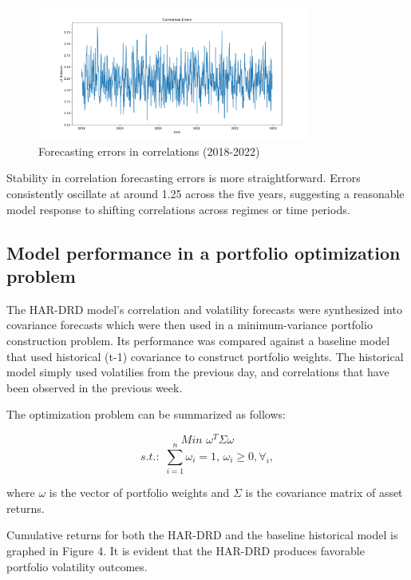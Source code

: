 \documentclass{article}
\begin{document}
\begin{figure}[ht]
    \centering
    \includegraphics[width=0.8\textwidth]{"Figures/CorrelationLoss.png"} 
    \captionsetup{width=0.7\textwidth,justification=centering}
    \caption{Forecasting errors in correlations (2018-2022)}
\end{figure}


Stability in correlation forecasting errors is more straightforward. Errors consistently
oscillate at around 1.25 across the five years, suggesting a reasonable model response to shifting correlations across
regimes or time periods.

\subsection{Model performance in a portfolio optimization problem}

The HAR-DRD model's correlation and volatility forecasts were synthesized into covariance forecasts which were then used in a minimum-variance portfolio construction problem.
Its performance was compared against a baseline model that used historical (t-1) covariance to construct
portfolio weights. The historical model simply used volatilies from the previous day, and correlations that have been observed in the 
previous week. 

The optimization problem can be summarized as follows:

$$ Min \,\, \omega^T \Sigma \omega $$
$$ s.t.: \,\,\sum_{i=1}^n \omega_i = 1,\,\omega_i \ge 0, \forall_i,$$


where $\omega$ is the vector of portfolio weights and $\Sigma$ is the covariance matrix of asset returns.

Cumulative returns for both the HAR-DRD and the baseline historical model is graphed in Figure 4.
It is evident that the HAR-DRD produces favorable portfolio volatility outcomes. 
\end{document}
